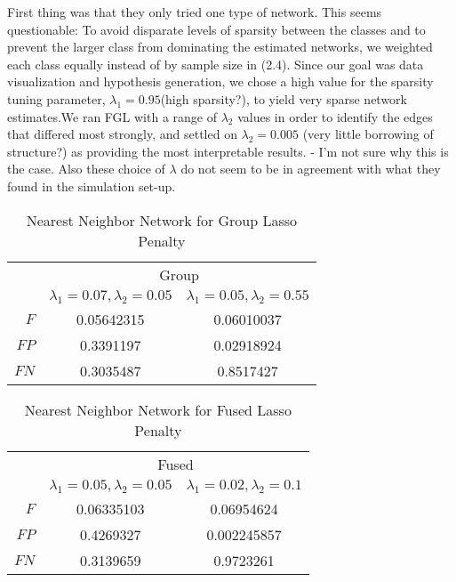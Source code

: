 \documentclass[12pt, leqno]{article}
\begin{document}
First thing was that they only tried
one type of network. This seems questionable: To avoid
disparate levels of sparsity between the classes and to prevent the
larger class from dominating the estimated networks, we weighted each
class equally instead of by sample size in (2.4). Since our goal was
data visualization and hypothesis generation, we chose a high value
for the sparsity tuning parameter, $\lambda_1 = 0.95$(high sparsity?), to yield very sparse
network estimates.We ran FGL with a range of $\lambda_2$ values in order to
identify the edges that differed most strongly, and settled
on $\lambda_2= 0.005$ (very little borrowing of structure?) as providing the most interpretable results.  -
I'm not sure why this is the case. Also these choice of $\lambda$ do
not seem to be in agreement with what they found in the simulation
set-up.

\begin{table}
\begin{center}
\begin{tabular}{r|c|c}
\toprule
&\multicolumn{2}{c}{Group}\\
&$\lambda_1 = 0.07,\lambda_2 = 0.05$&$\lambda_1 = 0.05,\lambda_2 = 0.55$\\
\midrule
$F$&0.05642315&0.06010037\\  
$FP$&0.3391197&0.02918924\\   
$FN$&0.3035487&0.8517427\\         
\bottomrule
\end{tabular}
\caption[]{Nearest Neighbor Network for Group Lasso Penalty}
\label{tab:compare1}
\end{center}
\end{table}

\begin{table}
\begin{center}
\begin{tabular}{r|c|c}
\toprule
&\multicolumn{2}{c}{Fused}\\
&$\lambda_1 = 0.05,\lambda_2 = 0.05$&$\lambda_1 = 0.02,\lambda_2 = 0.1$\\
\midrule
$F$&0.06335103&0.06954624\\  
$FP$&0.4269327&0.002245857\\   
$FN$&0.3139659&0.9723261\\         
\bottomrule
\end{tabular}
\caption[]{Nearest Neighbor Network for Fused Lasso Penalty}
\label{tab:compare2}
\end{center}
\end{table}
\end{document}
